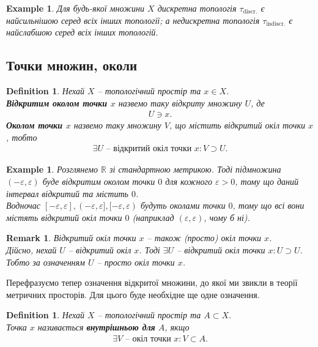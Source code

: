 \documentclass[a4paper, 10pt]{article}
\theoremstyle{theoremdd}
\newtheorem{definition}[theorem]{Definition}
\newtheorem{example}[theorem]{Example}
\newtheorem{remark}[theorem]{Remark}
\begin{document}
\begin{example}
Для будь-якої множини $X$ дискретна топологія $\tau_{\text{discr.}}$ є найсильнішою серед всіх інших топології; а недискретна топологія $\tau_{\text{indiscr.}}$ є найслабшою серед всіх інших топологій.
\end{example}

\subsection{Точки множин, околи}
\begin{definition}
Нехай $X$ -- топологічний простір та $x \in X$.\\
\textbf{Відкритим околом точки $x$} назвемо таку відкриту множину $U$, де
\begin{align*}
U \ni x.
\end{align*}
\textbf{Околом точки $x$} назвемо таку множину $V$, що містить відкритий окіл точки $x$, тобто
\begin{align*}
\exists U \text{ -- відкритий окіл точки } x: V \supset U.
\end{align*}
\end{definition}

\begin{example}
Розглянемо $\mathbb{R}$ зі стандартною метрикою. Тоді підмножина $(-\varepsilon,\varepsilon)$ буде відкритим околом точки $0$ для кожного $\varepsilon > 0$, тому що даний інтервал відкритий та містить $0$.\\
Водночас $[-\varepsilon,\varepsilon], (-\varepsilon,\varepsilon], [-\varepsilon,\varepsilon)$ будуть околами точки $0$, тому що всі вони містять відкритий окіл точки $0$ (\textit{наприклад $(\varepsilon,\varepsilon)$, чому б ні}). 
\end{example}

\begin{remark}
Відкритий окіл точки $x$ -- також (просто) окіл точки $x$.\\
Дійсно, нехай $U$ -- відкритий окіл $x$. Тоді $\exists U$ -- відкритий окіл точки $x: U \supset U$. Тобто за означенням $U$ -- просто окіл точки $x$.
\end{remark}
\noindent
Перефразуємо тепер означення відкритої множини, до якої ми звикли в теорії метричних просторів. Для цього буде необхідне ще одне означення.

\begin{definition}
Нехай $X$ -- топологічний простір та $A \subset X$.\\
Точка $x$ називається \textbf{внутрішньою для} $A$, якщо
\begin{align*}
\exists V \text{ -- окіл точки } x: V \subset A.
\end{align*}
\end{definition}
\end{document}
